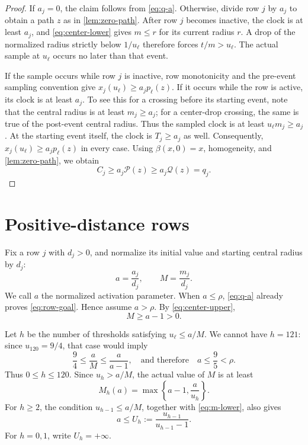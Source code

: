 \documentclass[11pt]{article}
\theoremstyle{definition}
\theoremstyle{remark}
\newcommand{\Qpath}{\mathcal Q}
\newcommand{\Ppath}{\mathcal P}
\begin{document}
\begin{proof}
If $a_j=0$, the claim follows from \eqref{eq:q-a}. Otherwise, divide row $j$
by $a_j$ to obtain a path $z$ as in \cref{lem:zero-path}.
After row $j$ becomes inactive, the clock is at least $a_j$, and
\eqref{eq:center-lower} gives $m\le r$ for its current radius $r$.
A drop of the normalized radius strictly below $1/u_\ell$ therefore forces
$t/m>u_\ell$. The actual sample at $u_\ell$ occurs no later than that event.

If the sample occurs while row $j$ is inactive, row monotonicity and the
pre-event sampling convention give
$x_j(u_\ell)\ge a_jp_\ell(z)$.
If it occurs while the row is active, its clock is at least $a_j$.
To see this for a crossing before its starting event, note that the central radius
is at least $m_j\ge a_j$; for a center-drop crossing, the same is true of the
post-event central radius. Thus the sampled clock is at least
$u_\ell m_j\ge a_j$. At the starting event itself, the clock is
$T_j\ge a_j$ as well.
Consequently, $x_j(u_\ell)\ge a_jp_\ell(z)$ in every case.
Using $\beta(x,0)=x$, homogeneity, and \cref{lem:zero-path}, we obtain
\[
  C_j\ge a_j\Ppath(z)\ge a_j\Qpath(z)=q_j.
\]
\end{proof}

\section{Positive-distance rows}\label{sec:positive}

Fix a row $j$ with $d_j>0$, and normalize its initial value and starting
central radius by $d_j$:
\begin{equation}\label{eq:normalized-a-m}
  a=\frac{a_j}{d_j},\qquad M=\frac{m_j}{d_j}.
\end{equation}
We call $a$ the normalized activation parameter.
When $a\le\rho$, \eqref{eq:q-a} already proves \eqref{eq:row-goal}.
Hence assume $a>\rho$. By \eqref{eq:center-upper},
\begin{equation}\label{eq:m-lower}
  M\ge a-1>0.
\end{equation}

Let $h$ be the number of thresholds satisfying $u_\ell\le a/M$.
We cannot have $h=121$: since $u_{120}=9/4$, that case would imply
\[
  \frac94\le\frac aM\le\frac a{a-1},
  \quad\text{and therefore}\quad a\le\frac95<\rho.
\]
Thus $0\le h\le120$. Since $u_h>a/M$, the actual value of $M$ is at least
\begin{equation}\label{eq:Mh}
  M_h(a)=\max\left\{a-1,\frac a{u_h}\right\}.
\end{equation}
For $h\ge2$, the condition $u_{h-1}\le a/M$, together with
\eqref{eq:m-lower}, also gives
\begin{equation}\label{eq:h-upper}
  a\le U_h:=\frac{u_{h-1}}{u_{h-1}-1}.
\end{equation}
For $h=0,1$, write $U_h=+\infty$.
\end{document}
